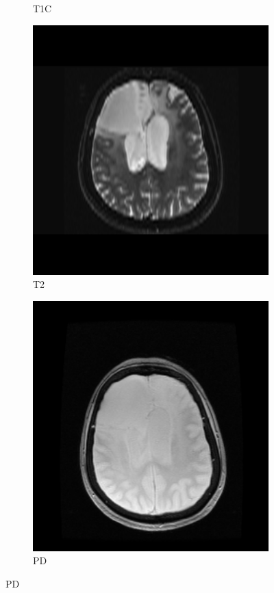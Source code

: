\begin{figure}
\begin{subfigure}[t]{\figexamplewidth}
    \caption{\gls{T1C}}\label{fig:T1GD}
\end{subfigure}
\begin{subfigure}[t]{\figexamplewidth}
    \centering
    \includegraphics[trim={0.5cm 0cm 0.5cm 1cm}, clip, width=\textwidth]{Figures/T2}
    \caption{\gls{T2}}\label{fig:T2w}
\end{subfigure}
\begin{subfigure}[t]{\figexamplewidth}
    \centering
    \includegraphics[trim={0.5cm 0cm 0.5cm 1cm}, clip, width=\textwidth]{Figures/PD}
    \caption{\gls{PD}}\label{fig:PDw}
\end{subfigure}



\end{figure}
